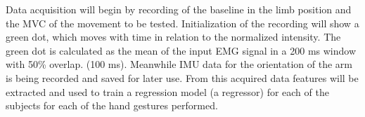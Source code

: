 Data acquisition will begin by recording of the baseline in the limb position and the MVC of the movement to be tested. Initialization of the recording will show a green dot, which moves with time in relation to the normalized intensity. The green dot is calculated as the mean of the input EMG signal in a 200 ms window with 50\% overlap. (100 ms). Meanwhile IMU data for the orientation of the arm is being recorded and saved for later use. %
From this acquired data features will be extracted and used to train a regression model (a regressor) for each of the subjects for each of the hand gestures performed.



%
%
%




